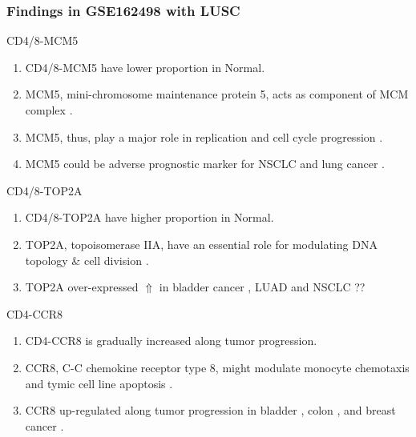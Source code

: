 \documentclass{beamer}
\begin{document}
    \begin{frame}[allowframebreaks]
        \frametitle{Findings in GSE162498 with LUSC}

        \begin{block}{CD4/8-MCM5}
            \begin{enumerate}
                \item CD4/8-MCM5 have lower proportion in Normal.
                \item MCM5, mini-chromosome maintenance protein 5, acts as component of MCM complex \cite{MCM5-1}.
                \item MCM5, thus, play a major role in replication and cell cycle progression \cite{MCM5-2}.
                \item MCM5 could be adverse prognostic marker for NSCLC \cite{MCM5-3} and lung cancer \cite{MCM5-4}.
            \end{enumerate}
        \end{block}

        \begin{block}{CD4/8-TOP2A}
            \begin{enumerate}
                \item CD4/8-TOP2A have higher proportion in Normal.
                \item TOP2A, topoisomerase IIA, have an essential role for modulating DNA topology \& cell division \cite{TOP2A-1}.
                \item TOP2A over-expressed $\Uparrow$ in bladder cancer \cite{TOP2A-2}, LUAD \cite{TOP2A-3} and NSCLC \cite{TOP2A-4} ??
            \end{enumerate}
        \end{block}

        \begin{block}{CD4-CCR8}
            \begin{enumerate}
                \item CD4-CCR8 is gradually increased along tumor progression.
                \item CCR8, C-C chemokine receptor type 8, might modulate monocyte chemotaxis and tymic cell line apoptosis \cite{CCR8-1}.
                \item CCR8 up-regulated along tumor progression in bladder \cite{CCR8-2}, colon \cite{CCR8-3}, and breast cancer \cite{CCR8-4}.
            \end{enumerate}
        \end{block}


\end{frame}
\end{document}

